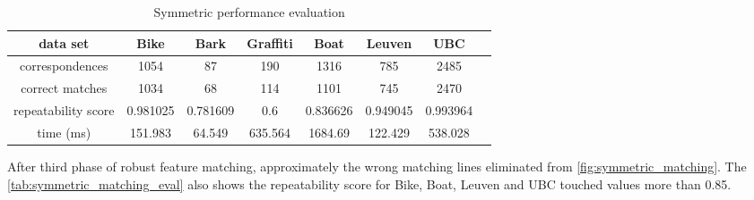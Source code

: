 \begin{table}[H]
  \begin{tabular}{| c || c | c | c | c | c | c | c |}
      \hline
      data set & Bike & Bark & Graffiti & Boat & Leuven & UBC \\ \hline \hline
      correspondences & 1054 & 87 & 190 & 1316 & 785 & 2485 \\ \hline
      correct matches & 1034 & 68 & 114 & 1101 & 745 & 2470 \\ \hline
      repeatability score & 0.981025 & 0.781609 & 0.6 & 0.836626 & 0.949045 & 0.993964 \\ \hline
      time (ms) & 151.983 & 64.549 & 635.564 & 1684.69 & 122.429 & 538.028 \\ \hline
  \end{tabular}
  \caption{Symmetric performance evaluation} \label{tab:symmetric_matching_eval}
\end{table}

After third phase of robust feature matching, approximately the wrong matching lines eliminated from \autoref{fig:symmetric_matching}. The \autoref{tab:symmetric_matching_eval} also shows the repeatability score for Bike, Boat, Leuven and UBC touched values more than 0.85.

